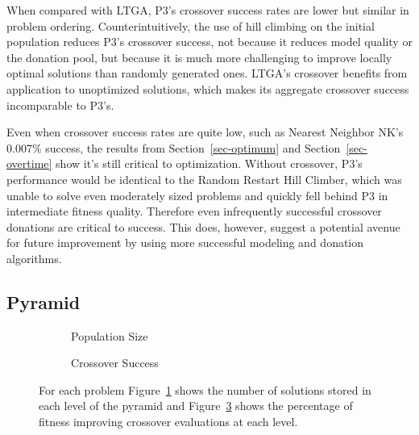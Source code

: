 When compared with LTGA, P3's crossover success rates are lower but similar in problem ordering.
Counterintuitively, the use of hill climbing on the initial population reduces
P3's crossover success, not because it reduces model quality or the donation pool, but because it is much more challenging to improve
locally optimal solutions than randomly generated ones. LTGA's crossover benefits from application to unoptimized solutions, which
makes its aggregate crossover success incomparable to P3's.

Even when crossover success rates are quite low, such as Nearest Neighbor NK's 0.007\% success,
the results from Section~\ref{sec-optimum} and Section~\ref{sec-overtime} show it's still critical to optimization. Without
crossover, P3's performance would be identical to the Random Restart Hill Climber, which was unable to solve even moderately sized problems
and quickly fell behind P3 in intermediate fitness quality. Therefore even infrequently successful crossover donations are
critical to success. This does, however, suggest a potential avenue for future improvement by using more successful
modeling and donation algorithms.

\subsection{Pyramid}
\begin{figure}[t]
  \begin{centering}
    \begin{subfigure}{.5\textwidth}
      \begin{centering}
      \end{centering}
      \caption{Population Size}
      \label{fig-level-size}
    \end{subfigure}%
    \begin{subfigure}{.5\textwidth}
      \begin{centering}
      \end{centering}
      \caption{Crossover Success}
      \label{fig-level-success}
    \end{subfigure}
  \end{centering}
  \caption{For each problem Figure~\ref{fig-level-size} shows the number of solutions stored in each level of the pyramid
           and Figure~\ref{fig-level-success} shows the percentage of fitness improving crossover evaluations at each level.}
\end{figure}

